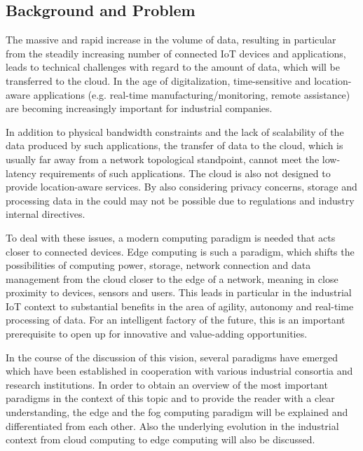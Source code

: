 \subsection{Background and Problem}\label{2.1}
The massive and rapid increase in the volume of data, resulting in particular from the steadily increasing number of connected IoT devices and applications, leads to technical challenges with regard to the amount of data, which will be transferred to the cloud. In the age of digitalization, time-sensitive and location-aware applications (e.g. real-time manufacturing/monitoring, remote assistance) are becoming increasingly important for industrial companies.\par
In addition to physical bandwidth constraints and the lack of scalability of the data produced by such applications, the transfer of data to the cloud, which is usually far away from a network topological standpoint, cannot meet the low-latency requirements of such applications. The cloud is also not designed to provide location-aware services. By also considering privacy concerns, storage and processing data in the could may not be possible due to regulations and industry internal directives.\par
To deal with these issues, a modern computing paradigm is needed that acts closer to connected devices. Edge computing is such a paradigm, which shifts the possibilities of computing power, storage, network connection and data management from the cloud closer to the edge of a network, meaning in close proximity to devices, sensors and users.
 This leads in particular in the industrial IoT context to substantial benefits in the area of agility, autonomy and real-time processing of data. For an intelligent factory of the future, this is an important prerequisite to open up for innovative and value-adding opportunities.\par 
In the course of the discussion of this vision, several paradigms have emerged which have been established in cooperation with various industrial consortia and research institutions. In order to obtain an overview of the most important paradigms in the context of this topic and to provide the reader with a clear understanding, the edge and the fog computing paradigm will be explained and differentiated from each other. Also the underlying evolution in the industrial context from cloud computing to edge computing will also be discussed.

